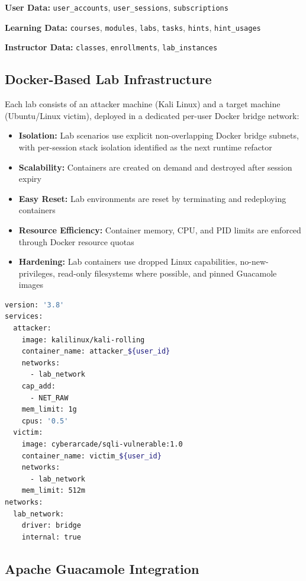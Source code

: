 \documentclass[12pt,a4paper]{report}
\begin{document}
\textbf{User Data:} \texttt{user\_accounts}, \texttt{user\_sessions}, \texttt{subscriptions}

\textbf{Learning Data:} \texttt{courses}, \texttt{modules}, \texttt{labs}, \texttt{tasks},
\texttt{hints}, \texttt{hint\_usages}

\textbf{Instructor Data:} \texttt{classes}, \texttt{enrollments}, \texttt{lab\_instances}

\subsection{Docker-Based Lab Infrastructure}

Each lab consists of an attacker machine (Kali Linux) and a target machine (Ubuntu/Linux victim),
deployed in a dedicated per-user Docker bridge network:
\begin{itemize}
  \item \textbf{Isolation:} Lab scenarios use explicit non-overlapping Docker bridge subnets, with per-session stack isolation identified as the next runtime refactor
  \item \textbf{Scalability:} Containers are created on demand and destroyed after session expiry
  \item \textbf{Easy Reset:} Lab environments are reset by terminating and redeploying containers
  \item \textbf{Resource Efficiency:} Container memory, CPU, and PID limits are enforced through Docker resource quotas
  \item \textbf{Hardening:} Lab containers use dropped Linux capabilities, no-new-privileges, read-only filesystems where possible, and pinned Guacamole images
\end{itemize}

\begin{lstlisting}[language=bash, caption={Sample Docker Compose for a Lab}]
version: '3.8'
services:
  attacker:
    image: kalilinux/kali-rolling
    container_name: attacker_${user_id}
    networks:
      - lab_network
    cap_add:
      - NET_RAW
    mem_limit: 1g
    cpus: '0.5'
  victim:
    image: cyberarcade/sqli-vulnerable:1.0
    container_name: victim_${user_id}
    networks:
      - lab_network
    mem_limit: 512m
networks:
  lab_network:
    driver: bridge
    internal: true
\end{lstlisting}

\subsection{Apache Guacamole Integration}
\end{document}
